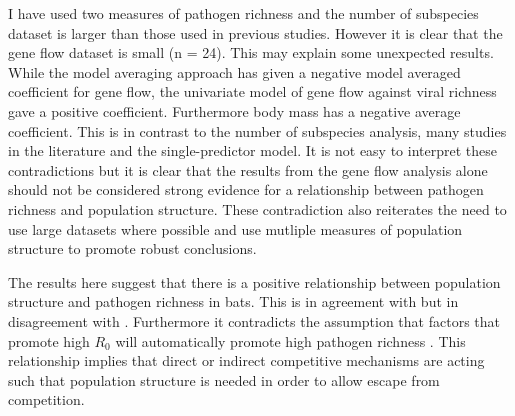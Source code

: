 I have used two measures of pathogen richness and the number of subspecies dataset is larger than those used in previous studies.
However it is clear that the gene flow dataset is small (n = 24).
This may explain some unexpected results.
While the model averaging approach has given a negative model averaged coefficient for gene flow, the univariate model of gene flow against viral richness gave a positive coefficient.
Furthermore body mass has a negative average coefficient.
This is in contrast to the number of subspecies analysis, many studies in the literature \cite{kamiya2014determines, turmelle2009correlates, gay2014parasite, maganga2014bat} and the single-predictor model.
It is not easy to interpret these contradictions but it is clear that the results from the gene flow analysis alone should not be considered strong evidence for a relationship between pathogen richness and population structure.
These contradiction also reiterates the need to use large datasets where possible and use mutliple measures of population structure to promote robust conclusions.


The results here suggest that there is a positive relationship between population structure and pathogen richness in bats.
This is in agreement with \cite{maganga2014bat, turmelle2009correlates} but in disagreement with \cite{gay2014parasite}.
Furthermore it contradicts the assumption that factors that promote high $R_0$ will automatically promote high pathogen richness \cite{nunn2003comparative, morand2000wormy}.
This relationship implies that direct or indirect competitive mechanisms are acting such that population structure is needed in order to allow escape from competition.

